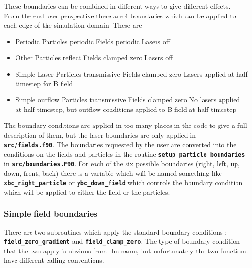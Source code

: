 \documentclass[12pt,a4paper]{article}
\newcommand{\inlinecode}[1]{{\color{warwickred} \bf\texttt{#1}}}
\begin{document}
These boundaries can be combined in different ways to give different
effects. From the end user perspective there are 4 boundaries which can be
applied to each edge of the simulation domain. These are
\begin{itemize}
\item Periodic
  \subitem Particles periodic
  \subitem Fields periodic
  \subitem Lasers off
\item Other
  \subitem Particles reflect
  \subitem Fields clamped zero
  \subitem Lasers off
\item Simple Laser
  \subitem Particles transmissive
  \subitem Fields clamped zero
  \subitem Lasers applied at half timestep for B field
\item Simple outflow
  \subitem Particles transmissive
  \subitem Fields clamped zero
  \subitem No lasers applied at half timestep, but outflow conditions applied
  to B field at half timestep
\end{itemize}
The boundary conditions are applied in too many places in the code to give a
full description of them, but the laser boundaries are only applied in
\inlinecode{src/fields.f90}. The boundaries requested by the user are converted
into the conditions on the fields and particles in the routine
\inlinecode{setup\_particle\_boundaries} in
\inlinecode{src/boundaries.F90}. For each of the six possible boundaries
(right, left, up, down, front, back) there is a variable which will be named
something like \inlinecode{xbc\_right\_particle} or
\inlinecode{ybc\_down\_field} which controls the boundary condition which will
be applied to either the field or the particles.

\subsubsection{Simple field boundaries}
There are two subroutines which apply the standard boundary conditions :
\inlinecode{field\_zero\_gradient} and \inlinecode{field\_clamp\_zero}. The
type of boundary condition that the two apply is obvious from the name, but
unfortunately the two functions have different calling conventions.
\end{document}
